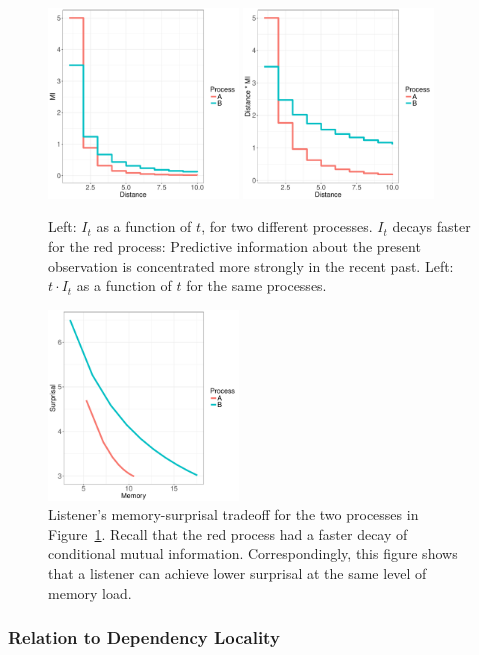 \begin{figure}
\includegraphics[width=0.45\textwidth]{figures/decay.pdf}
\includegraphics[width=0.45\textwidth]{figures/memory.pdf}
%
	\caption{Left: $I_t$ as a function of $t$, for two different processes. $I_t$ decays faster for the red process: Predictive information about the present observation is concentrated more strongly in the recent past. Left: $t \cdot I_t$ as a function of $t$ for the same processes. }\label{fig:basic}
\end{figure}

\begin{figure}
\includegraphics[width=0.45\textwidth]{figures/listener-tradeoff.pdf}
	\caption{Listener's memory-surprisal tradeoff for the two processes in Figure~\ref{fig:basic}. Recall that the red process had a faster decay of conditional mutual information. Correspondingly, this figure shows that a listener can achieve lower surprisal at the same level of memory load.}\label{fig:listener-tradeoff}
\end{figure}



\subsubsection{Relation to Dependency Locality}



